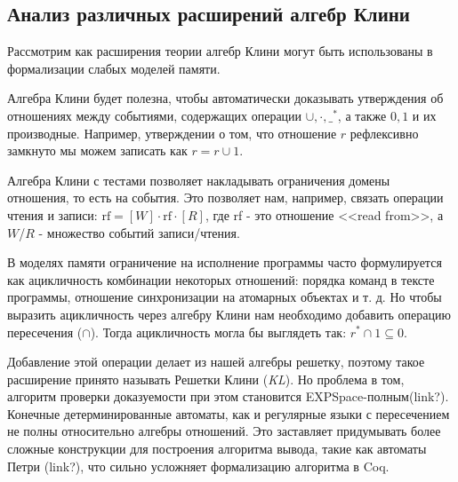 \documentclass[times
              ]{itmo-student-thesis}
\begin{document}

  \subsection{Анализ различных расширений алгебр Клини}
    Рассмотрим как расширения теории алгебр Клини могут быть использованы в формализации слабых моделей памяти.

    Алгебра Клини будет полезна, чтобы автоматически доказывать утверждения об отношениях между событиями,
    содержащих операции $ \cup, \cdot, \_^* $, а также $0, 1 $ и их производные.
    Например, утверждении о том, что отношение $ r $ рефлексивно замкнуто мы можем записать как $ r = r \cup 1 $.

    Алгебра Клини с тестами позволяет накладывать ограничения домены отношения, то есть на события. Это позволяет нам, например, связать операции чтения и записи:
    $ \text{rf} = [W] \cdot \text{rf} \cdot [R] $,
      где rf - это отношение <<read from>>,
      а $W$/$R$ - множество событий записи/чтения.


    В моделях памяти ограничение на исполнение программы часто формулируется как ацикличность комбинации некоторых отношений: порядка команд в тексте программы, отношение синхронизации на атомарных объектах и т. д.
    Но чтобы выразить ацикличность через алгебру Клини нам необходимо добавить операцию пересечения ($\cap$).
    Тогда ацикличность могла бы выглядеть так: $ r^* \cap 1 \subseteq 0 $.

    Добавление этой операции делает из нашей алгебры решетку, поэтому такое расширение принято называть Решетки Клини (\textit{KL}).
    Но проблема в том, алгоритм проверки доказуемости при этом становится EXPSpace-полным(link?).
    Конечные детерминированные автоматы, как и регулярные языки с пересечением не полны относительно алгебры отношений.
    Это заставляет придумывать более сложные конструкции для построения алгоритма вывода, такие как автоматы Петри (link?), что сильно усложняет формализацию алгоритма в Coq.
\end{document}
